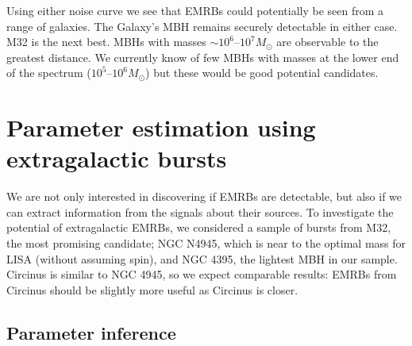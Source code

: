 Using either noise curve we see that EMRBs could potentially be seen from a range of galaxies. The Galaxy's MBH remains securely detectable in either case. M32 is the next best. MBHs with masses $\sim 10^6$--$10^7 M_\odot$ are observable to the greatest distance. We currently know of few MBHs with masses at the lower end of the spectrum ($10^5$--$10^6 M_\odot$) but these would be good potential candidates.

\section{Parameter estimation using extragalactic bursts}\label{sec:extragal-Res}

We are not only interested in discovering if EMRBs are detectable, but also if we can extract information from the signals about their sources. To investigate the potential of extragalactic EMRBs, we considered a sample of bursts from M32, the most promising candidate; NGC N4945, which is near to the optimal mass for LISA (without assuming spin), and NGC 4395, the lightest MBH in our sample. Circinus is similar to NGC 4945, so we expect comparable results: EMRBs from Circinus should be slightly more useful as Circinus is closer.

\subsection{Parameter inference}

